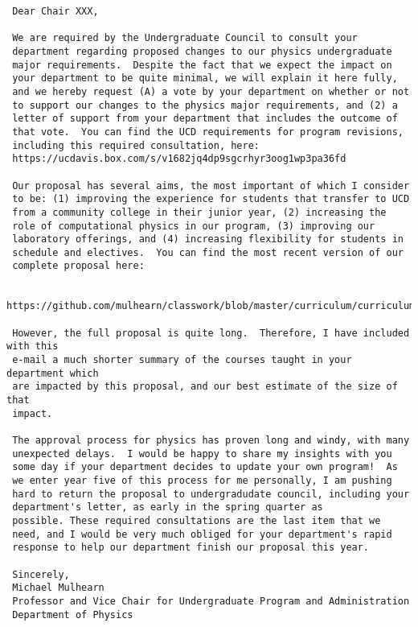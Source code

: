 \documentclass[12pt]{article}
\begin{document}
\begin{verbatim}
 Dear Chair XXX,

 We are required by the Undergraduate Council to consult your
 department regarding proposed changes to our physics undergraduate
 major requirements.  Despite the fact that we expect the impact on
 your department to be quite minimal, we will explain it here fully,
 and we hereby request (A) a vote by your department on whether or not
 to support our changes to the physics major requirements, and (2) a
 letter of support from your department that includes the outcome of
 that vote.  You can find the UCD requirements for program revisions,
 including this required consultation, here:
 https://ucdavis.box.com/s/v1682jq4dp9sgcrhyr3oog1wp3pa36fd

 Our proposal has several aims, the most important of which I consider
 to be: (1) improving the experience for students that transfer to UCD
 from a community college in their junior year, (2) increasing the
 role of computational physics in our program, (3) improving our
 laboratory offerings, and (4) increasing flexibility for students in
 schedule and electives.  You can find the most recent version of our
 complete proposal here:
 
 https://github.com/mulhearn/classwork/blob/master/curriculum/curriculum.pdf

 However, the full proposal is quite long.  Therefore, I have included with this
 e-mail a much shorter summary of the courses taught in your department which
 are impacted by this proposal, and our best estimate of the size of that
 impact.

 The approval process for physics has proven long and windy, with many
 unexpected delays.  I would be happy to share my insights with you
 some day if your department decides to update your own program!  As
 we enter year five of this process for me personally, I am pushing
 hard to return the proposal to undergradudate council, including your
 department's letter, as early in the spring quarter as
 possible. These required consultations are the last item that we
 need, and I would be very much obliged for your department's rapid
 response to help our department finish our proposal this year.

 Sincerely,
 Michael Mulhearn
 Professor and Vice Chair for Undergraduate Program and Administration
 Department of Physics
\end{verbatim}


\newpage
\end{document}
